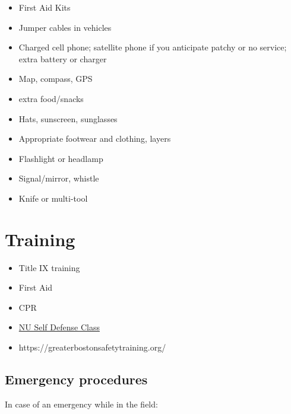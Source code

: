 \documentclass[
  letterpaper,
  DIV=11,
  numbers=noendperiod]{scrreprt}
\begin{document}
\begin{itemize}
\item
  First Aid Kits
\item
  Jumper cables in vehicles
\item
  Charged cell phone; satellite phone if you anticipate patchy or no
  service; extra battery or charger
\item
  Map, compass, GPS
\item
  extra food/snacks
\item
  Hats, sunscreen, sunglasses
\item
  Appropriate footwear and clothing, layers
\item
  Flashlight or headlamp
\item
  Signal/mirror, whistle
\item
  Knife or multi-tool
\end{itemize}

\hypertarget{training}{%
\section*{\texorpdfstring{\textbf{Training}}{Training}}\label{training}}


\begin{itemize}
\item
  Title IX training
\item
  First Aid
\item
  CPR
\item
  \href{https://nupd.northeastern.edu/our-services/safety-training/}{NU
  Self Defense Class}
\item
  https://greaterbostonsafetytraining.org/
\end{itemize}

\hypertarget{emergency-procedures}{%
\subsection*{\texorpdfstring{\textbf{Emergency
procedures}}{Emergency procedures}}\label{emergency-procedures}}

In case of an emergency while in the field:
\end{document}
